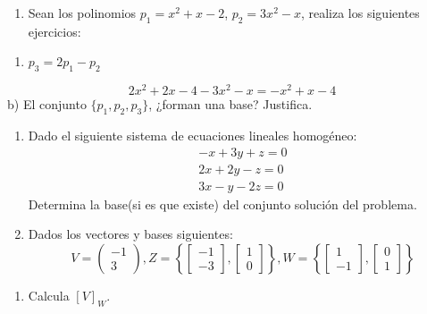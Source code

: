 \documentclass[
  11,
]{article}
\providecommand{\tightlist}{%
  \setlength{\itemsep}{0pt}\setlength{\parskip}{0pt}}
\begin{document}
\begin{enumerate}
\def\labelenumi{\arabic{enumi}.}
\setcounter{enumi}{2}
\tightlist
\item
  Sean los polinomios \(p_1 = x^2 + x - 2\), \(p_2 = 3x^2-x\), realiza
  los siguientes ejercicios:
\end{enumerate}

\begin{enumerate}
\def\labelenumi{\alph{enumi})}
\tightlist
\item
  \(p_3 = 2p_1 - p_2\)
\end{enumerate}

\[
  2x^2 + 2x - 4 - 3x^2 - x = -x^2+x-4
  \] b) El conjunto \(\{p_1,p_2,p_3\}\), ¿forman una base? Justifica.

\begin{enumerate}
\def\labelenumi{\arabic{enumi}.}
\setcounter{enumi}{3}
\item
  Dado el siguiente sistema de ecuaciones lineales homogéneo:
  \[\begin{align*}-x+3y+z = 0 \\ 2x+2y-z=0\\3x-y-2z=0\end{align*}\]
  Determina la base(si es que existe) del conjunto solución del
  problema.
\item
  Dados los vectores y bases siguientes:
  \[V = \begin{pmatrix}-1\\3\end{pmatrix}, Z = \left\{ \begin{bmatrix}-1\\-3\end{bmatrix}, \begin{bmatrix}1\\0\end{bmatrix} \right\}, W = \left\{ \begin{bmatrix}1\\-1\end{bmatrix}, \begin{bmatrix}0\\1\end{bmatrix} \right\}\]
\end{enumerate}

\begin{enumerate}
\def\labelenumi{\alph{enumi})}
\tightlist
\item
  Calcula \([V]_W\).
\end{enumerate}
\end{document}
